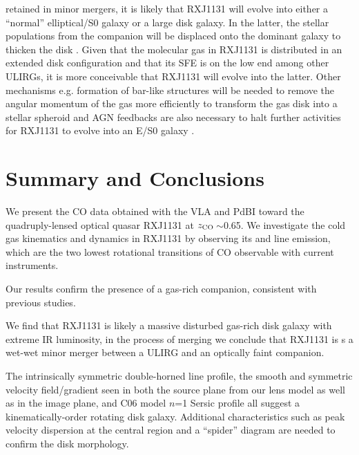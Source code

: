 \documentclass[]{emulateapj}
\begin{document}
retained in minor mergers,
it is likely that RXJ1131 will evolve into either a 
``normal'' elliptical/S0 galaxy or a large disk galaxy.  
In the latter, the stellar populations from the companion will be displaced onto the 
dominant galaxy to thicken the disk \citep[\eg][]{Lotz08a, Robertson06a}.
Given that the molecular gas in 
RXJ1131 is distributed in an extended disk configuration and that its 
SFE is on the low end among other ULIRGs,  %
it is more conceivable that RXJ1131 will evolve into the
latter.
Other mechanisms e.g. formation of bar-like structures will be needed to remove the
angular momentum of the gas more efficiently to transform the gas disk into a stellar spheroid and
AGN feedbacks are also necessary to halt further activities for RXJ1131 to evolve into an 
E/S0 galaxy \citep{Lotz08a}.

\section{Summary and Conclusions} \label{sec:sum}

We present the CO data obtained with the VLA and PdBI toward the 
quadruply-lensed optical quasar RXJ1131 at $z_{\rm CO}$\,$\sim$0.65.
We investigate the cold gas kinematics and dynamics in RXJ1131
by observing its \bco and \cco line emission, which are the
two lowest rotational transitions of CO observable with current instruments.

Our results confirm the presence of a gas-rich companion, consistent with previous studies.

We find that RXJ1131 is likely a massive disturbed gas-rich disk galaxy with extreme IR
luminosity, in the process of merging 
we conclude that RXJ1131 is s a wet-wet minor merger 
between a ULIRG and an optically faint companion.

The intrinsically symmetric double-horned line profile, the smooth and 
symmetric velocity field/gradient seen in both the source plane from our lens model as well 
as in the image plane, and C06 model $n$=1 Sersic profile all suggest
a kinematically-order rotating disk galaxy.
Additional
characteristics such as peak velocity dispersion at the central region and a
``spider'' diagram are needed to confirm the disk morphology.
\end{document}
